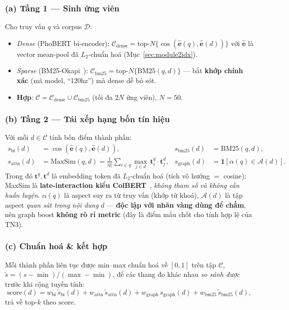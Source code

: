 \documentclass[12pt,a4paper]{article}
\begin{document}
\subsubsection*{(a) Tầng 1 --- Sinh ứng viên}
Cho truy vấn $q$ và corpus $\mathcal{D}$:
\begin{itemize}[leftmargin=1.5cm,itemsep=1pt]
  \item \textit{Dense} (PhoBERT bi-encoder): $\mathcal{C}_{\text{dense}}=\text{top-}N\big\{\cos(\hat{\mathbf{e}}(q),\hat{\mathbf{e}}(d))\big\}$ với $\hat{\mathbf{e}}$ là vector mean-pool đã $L_2$-chuẩn hoá (Mục~\ref{sec:module2idx}).
  \item \textit{Sparse} (BM25-Okapi~\cite{robertson2009bm25}): $\mathcal{C}_{\text{bm25}}=\text{top-}N\big\{\text{BM25}(q,d)\big\}$ --- bắt \textbf{khớp chính xác} (mã model, ``120hz'') mà dense dễ bỏ sót.
  \item \textbf{Hợp}: $\mathcal{C}=\mathcal{C}_{\text{dense}}\cup\mathcal{C}_{\text{bm25}}$ (tối đa $2N$ ứng viên), $N=50$.
\end{itemize}

\subsubsection*{(b) Tầng 2 --- Tái xếp hạng bốn tín hiệu}
Với mỗi $d\in\mathcal{C}$ tính bốn điểm thành phần:
\begin{align*}
  s_{\text{bi}}(d)    &= \cos(\hat{\mathbf{e}}(q),\hat{\mathbf{e}}(d)),
  & s_{\text{bm25}}(d) &= \text{BM25}(q,d), \\
  s_{\text{attn}}(d)  &= \text{MaxSim}(q,d)=\frac{1}{|q|}\sum_{i\in q}\max_{j\in d}\,\mathbf{t}^{q}_i\!\cdot\!\mathbf{t}^{d}_j,
  & s_{\text{graph}}(d)&= \mathbf{1}\!\left[\alpha(q)\in\mathcal{A}(d)\right].
\end{align*}
Trong đó $\mathbf{t}^{q},\mathbf{t}^{d}$ là embedding token đã $L_2$-chuẩn hoá (tích vô hướng $=$ cosine); MaxSim là \textbf{late-interaction kiểu ColBERT}~\cite{khattab2020colbert}, \textit{không tham số và không cần huấn luyện}. $\alpha(q)$ là aspect suy ra từ truy vấn (khớp từ khoá), $\mathcal{A}(d)$ là tập aspect \textit{quan sát trong nội dung} $d$ --- \textbf{độc lập với nhãn vàng dùng để chấm}, nên graph boost \textbf{không rò rỉ metric} (đây là điểm mấu chốt cho tính hợp lệ của TN3).

\subsubsection*{(c) Chuẩn hoá \& kết hợp}
Mỗi thành phần liên tục được min--max chuẩn hoá về $[0,1]$ trên tập $\mathcal{C}$, $\tilde{s}=(s-\min)/(\max-\min)$, để các thang đo khác nhau \textit{so sánh được} trước khi cộng tuyến tính:
\[
  \text{score}(d)=w_{\text{bi}}\,\tilde{s}_{\text{bi}}(d)
  + w_{\text{attn}}\,\tilde{s}_{\text{attn}}(d)
  + w_{\text{graph}}\,s_{\text{graph}}(d)
  + w_{\text{bm25}}\,\tilde{s}_{\text{bm25}}(d),
\]
trả về top-$k$ theo $\text{score}$.
\end{document}
